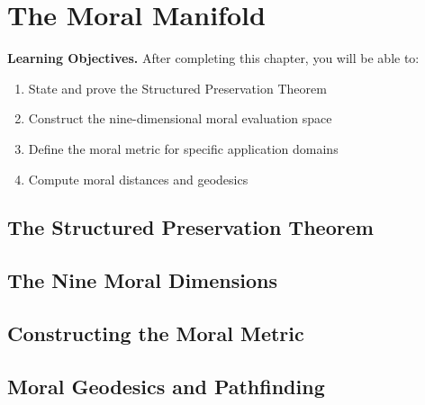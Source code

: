\documentclass[12pt,letterpaper,twoside,openright]{book}
\theoremstyle{plain}
\theoremstyle{definition}
\theoremstyle{remark}
\newcommand{\R}{\mathbb{R}}
\begin{document}
\chapter{The Moral Manifold}
\label{ch:moral-manifold}

\begin{framed}
\noindent\textbf{Learning Objectives.} After completing this chapter, you will be able to:
\begin{enumerate}
    \item State and prove the Structured Preservation Theorem
    \item Construct the nine-dimensional moral evaluation space
    \item Define the moral metric for specific application domains
    \item Compute moral distances and geodesics
\end{enumerate}
\end{framed}

\section{The Structured Preservation Theorem}

\section{The Nine Moral Dimensions}

\section{Constructing the Moral Metric}

\section{Moral Geodesics and Pathfinding}
\end{document}

